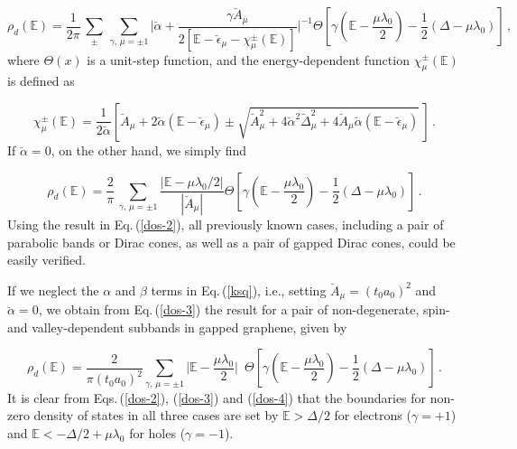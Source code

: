 \documentclass[aps,prb,showpacs]{revtex4}
\newcommand{\mbb}{\mathbb}
\begin{document}
\begin{equation}
\rho_d(\mbb{E}) = \frac{1}{2\pi} \, \sum\limits_{\pm} \, \sum\limits_{\gamma,\,\mu=\pm 1} 
\Big|
\breve{\alpha} + \frac{\gamma\breve{A}_\mu}{2[\mbb{E}-\breve{\epsilon}_\mu - \chi_\mu^\pm(\mbb{E})]} 
\Big|^{-1} 
\Theta \left[
\gamma\left(\mbb{E} -\frac{\mu\lambda_0}{2}\right) - \frac{1}{2} \left( \Delta - \mu\lambda_0 \right)
\right]\, ,
\label{dos-2}
\end{equation}
where $\Theta(x)$ is a unit-step function, and the energy-dependent function $\chi_\mu^{\pm}(\mbb{E})$ is defined as

\begin{equation}
\chi_\mu^{\pm}(\mbb{E}) = \frac{1}{2 \breve{\alpha}} \left[ \breve{A}_\mu + 2\breve{\alpha} (\mbb{E} - \breve{\epsilon}_\mu)  \pm
\sqrt{
\breve{A}_\mu^2+ 4 \breve{\alpha}^2 \breve{\Delta}_\mu^2 + 4 \breve{A}_\mu \breve{\alpha} (\mbb{E} - \breve{\epsilon}_\mu)}\,\right] \, .
\end{equation}
If $\breve{\alpha}=0$, on the other hand, we simply find

\begin{equation}
\rho_d(\mbb{E}) = \frac{2}{\pi} \, \sum\limits_{\gamma,\,\mu=\pm 1} 
\frac{|\mbb{E}-\mu\lambda_0/2|}{|\breve{A}_\mu|} 
\Theta \left[
\gamma\left(\mbb{E} -\frac{\mu\lambda_0}{2}\right) - \frac{1}{2} \left( \Delta - \mu\lambda_0 \right)
\right]\, .
\label{dos-3}
\end{equation}
Using the result in Eq.\,(\ref{dos-2}), all previously known cases, including a pair of parabolic bands or Dirac cones, as well as a pair of gapped Dirac cones, could be easily verified. 
\medskip

If we neglect the $\alpha$ and $\beta$ terms in Eq.\,(\ref{ksq}), i.e., setting $\breve{A}_\mu=(t_0a_0)^2$ and $\breve{\alpha}=0$, we obtain from Eq.\,(\ref{dos-3})
the result for a pair of non-degenerate, spin- and valley-dependent subbands in gapped graphene, given by

\begin{equation}
\rho_d(\mbb{E}) = \frac{2}{\pi(t_0a_0)^2} \sum \limits_{\gamma,\,\mu = \pm 1} \Big| \mbb{E} -\frac{\mu\lambda_0}{2}  \Big| \,\,\, 
 \Theta \left[
 \gamma\left(\mbb{E} -\frac{\mu\lambda_0}{2}\right) - \frac{1}{2} \left( \Delta - \mu\lambda_0 \right)
 \right]\, .
 \label{dos-4}
\end{equation}
It is clear from Eqs.\,(\ref{dos-2}), (\ref{dos-3}) and (\ref{dos-4}) that the boundaries for non-zero density of states in all three cases are set by
$\mbb{E} > \Delta/2$ for electrons ($\gamma = +1$) and $\mbb{E} < - \Delta / 2 + \mu\lambda_0 $ for holes ($\gamma = - 1$). 
\medskip
\end{document}

